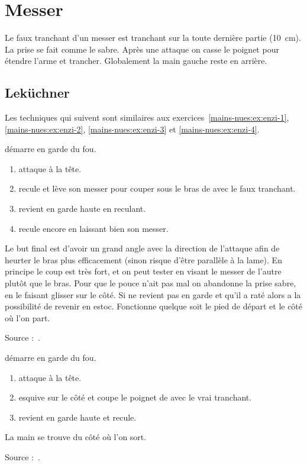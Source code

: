 \chapter{Messer}


Le faux tranchant d'un messer est tranchant sur la toute dernière partie (\SI{10}{cm}). La prise se fait comme le sabre.
Après une attaque on casse le poignet pour étendre l'arme et trancher.
Globalement la main gauche reste en arrière.


\section{Leküchner}
\label{sec:messer:lekuchner}


Les techniques qui suivent sont similaires aux exercices~\ref{mains-nues:ex:enzi-1}, \ref{mains-nues:ex:enzi-2}, \ref{mains-nues:ex:enzi-3} et \ref{mains-nues:ex:enzi-4}.


\begin{technique}

\D démarre en garde du fou.

\begin{enumerate}
	\item \A attaque à la tête.
	\item \D recule et lève son messer pour couper sous le bras de \A avec le faux tranchant.
	\item \D revient en garde haute en reculant.
	\item \D recule encore en laissant bien son messer.
\end{enumerate}

Le but final est d'avoir un grand angle avec la direction de l'attaque afin de heurter le bras plus efficacement (sinon risque d'être parallèle à la lame).
En principe le coup est très fort, et on peut tester en visant le messer de l'autre plutôt que le bras. Pour que le pouce n'ait pas mal on abandonne la prise sabre, en le faisant glisser sur le côté.
Si \D ne revient pas en garde et qu'il a raté alors \A a la possibilité de revenir en estoc.
Fonctionne quelque soit le pied de départ et le côté où l'on part.

Source :~\cite{enzi:dijon:messer_inner:2015}.

\end{technique}


\begin{technique}

\D démarre en garde du fou.

\begin{enumerate}
	\item \A attaque à la tête.
	\item \D esquive sur le côté et coupe le poignet de \A avec le vrai tranchant.
	\item \D revient en garde haute et recule.
\end{enumerate}

La main se trouve du côté où l'on sort.

Source :~\cite{enzi:dijon:messer_inner:2015}.

\end{technique}


